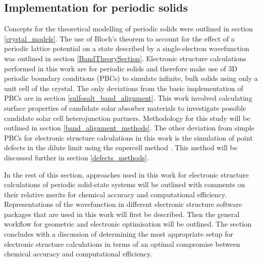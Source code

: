 \documentclass[11pt, twoside]{report}
\begin{document}


\subsection{Implementation for periodic solids}

Concepts for the theoretical modelling of periodic solids were outlined in section \ref{crystal_models}. The use of Bloch's theorem to account for the effect of a periodic lattice potential on a state described by a single-electron wavefunction was outlined in section \ref{BandTheorySection}. Electronic structure calculations performed in this work are for periodic solids and therefore make use of 3D periodic boundary conditions (PBCs) to simulate infinite, bulk solids using only a unit cell of the crystal. The only deviations from the basic implementation of PBCs are in section \ref{sulfosalt_band_alignment}. This work involved calculating surface properties of candidate solar absorber materials to investigate possible candidate solar cell heterojunction partners. Methodology for this study will be outlined in section \ref{band_alignment_methods}. The other deviation from simple PBCs for electronic structure calculations in this work is the simulation of point defects in the dilute limit using the supercell method \cite{SupercellMethodDefects}. This method will be discussed further in section \ref{defects_methods}. 

In the rest of this section, approaches used in this work for electronic structure calculations of periodic solid-state systems will be outlined with comments on their relative merits for chemical accuracy and computational efficiency. Representations of the wavefunction in different electronic structure software packages that are used in this work will first be described. Then the general workflow for geometric and electronic optimisation will be outlined. The section concludes with a discussion of determining the most appropriate setup for electronic structure calculations in terms of an optimal compromise between chemical accuracy and computational efficiency.

\end{document}
